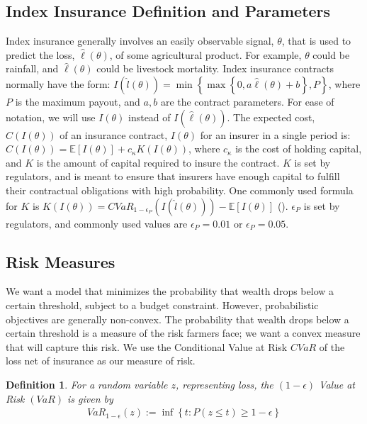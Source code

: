 \documentclass[11pt]{article}
\newtheorem{defn}[lemma]{Definition}
\begin{document}
  \subsection{Index Insurance Definition and Parameters}
    Index insurance generally involves an easily observable signal, $\theta$, that is used to predict the loss, $\hat{\ell}(\theta)$, of some agricultural product. For example, $\theta$ could be rainfall, and $\hat{\ell}(\theta)$ could be livestock mortality. Index insurance contracts normally have the form: $I(\hat{l}(\theta)) = \min \left \{\max \left \{0,a\hat{\ell}(\theta) + b \right \}, P \right \}$, where $P$ is the maximum payout, and $a,b$ are the contract parameters. For ease of notation, we will use $I(\theta)$ instead of $I(\hat{\ell}(\theta))$. The expected cost, $C(I(\theta))$ of an insurance contract, $I(\theta)$ for an insurer in a single period is: $C(I(\theta)) = \mathbb{E}[I(\theta)] + c_{\kappa} K(I(\theta))$, where $c_{\kappa}$ is the cost of holding capital, and $K$ is the amount of capital required to insure the contract. $K$ is set by regulators, and is meant to ensure that insurers have enough capital to fulfill their contractual obligations with high probability. One commonly used formula for $K$ is $K(I(\theta)) = CVaR_{1-\epsilon_P}\left ( I(\hat{l}(\theta)) \right ) - \mathbb{E}[I(\theta)]$ (\cite{mapfumo2017risk}). $\epsilon_P$ is set by regulators, and commonly used values are $\epsilon_P = 0.01$ or $\epsilon_P = 0.05$. 

  \subsection{Risk Measures}
    We want a model that minimizes the probability that wealth drops below a certain threshold, subject to a budget constraint. However, probabilistic objectives are generally non-convex. The probability that wealth drops below a certain threshold is a measure of the risk farmers face; we want a convex measure that will capture this risk. We use the Conditional Value at Risk $CVaR$ of the loss net of insurance as our measure of risk. 

    \begin{defn}
        For a random variable $z$, representing loss, the $(1-\epsilon)$ Value at Risk $(VaR)$ is given by 
        \begin{align*}
        VaR_{1-\epsilon}(z) := \inf \left \{ t : P(z \leq t) \geq 1-\epsilon \right \}
        \end{align*}
    \end{defn}
\end{document}

